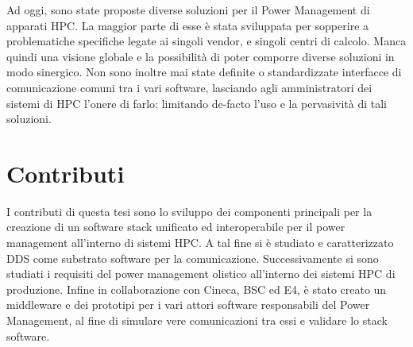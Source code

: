 Ad oggi, sono state proposte diverse soluzioni per il Power Management di apparati HPC. La maggior parte di esse è stata sviluppata per sopperire a problematiche specifiche legate ai singoli vendor, e singoli centri di calcolo. Manca quindi una visione globale e la possibilità di poter comporre diverse soluzioni in modo sinergico.
Non sono inoltre mai state definite o standardizzate interfacce di comunicazione comuni tra i vari software, lasciando agli amministratori dei sistemi di HPC l'onere di farlo: limitando de-facto l'uso e la pervasività di tali soluzioni.





\section{Contributi}
I contributi di questa tesi sono lo sviluppo dei componenti principali per la creazione di un software stack unificato ed interoperabile per il power management all'interno di sistemi HPC. A tal fine si è studiato e caratterizzato DDS come substrato software per la comunicazione. Successivamente si sono studiati i requisiti del power management olistico all'interno dei sistemi HPC di produzione. Infine in collaborazione con Cineca\cite{Cineca}, BSC\cite{BSC} ed E4\cite{E4}, è stato creato un middleware e dei prototipi per i vari attori software responsabili del Power Management, al fine di simulare vere comunicazioni tra essi e validare lo stack software.